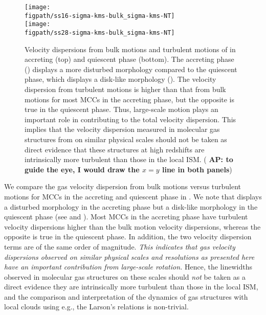 \IfFileExists{emulateapjlegacy.cls}{\documentclass[iop]{emulateapjlegacy}}{\documentclass[iop]{emulateapj}}
\newcommand{\AP}[1]{({\bf \color{apcolor} AP: #1})}
\def\figpath{./Fig}
\begin{document}
\begin{figure}
\centering
\texttt{[image: \\figpath/ss16-sigma-kms-bulk\_sigma-kms-NT]} \\
\texttt{[image: \\figpath/ss28-sigma-kms-bulk\_sigma-kms-NT]}
\caption{Velocity dispersions from bulk motions and turbulent motions of \flower in accreting (top) and
quiescent phase (bottom). The accreting phase () displays a more disturbed morphology compared to the
quiescent phase, which displays a disk-like morphology ().
The velocity dispersion from turbulent motions is higher than that from bulk motions for most MCCs in the accreting phase, but
the opposite is true in the quiescent phase. Thus, large-scale motion plays an important role in contributing to the total velocity dispersion.
This implies that the velocity dispersion measured in molecular gas structures from \obs on similar physical scales
should not be taken as direct evidence that these structures at high redshifts are intrinsically more turbulent than those in the local ISM. \AP{to guide the eye, I would draw the $x=y$ line in both panels}
\label{fig:vv}}
\vspace{0.5em}
\end{figure}

We compare the gas velocity dispersion from bulk motions versus turbulent motions for MCCs in the accreting
and quiescent phase in . We note that \flower displays a disturbed morphology in the accreting phase
but a disk-like morphology in the quiescent phase
(see  and ).
Most MCCs in the accreting phase have turbulent velocity dispersions higher than the bulk motion velocity dispersions,
whereas the opposite is true in the quiescent phase. In addition, the two velocity dispersion terms are of the same order of magnitude.
{\em This indicates that gas velocity dispersions observed on similar physical scales and resolutions as presented here
have an important contribution from large-scale rotation.} Hence, the linewidths observed in \highz molecular gas structures
on these scales should {\em not} be taken as a direct evidence they are intrinsically more turbulent than those in the local ISM,
and the comparison and interpretation of the dynamics of gas structures with local clouds using e.g., the Larson's relations is non-trivial.
\end{document}
